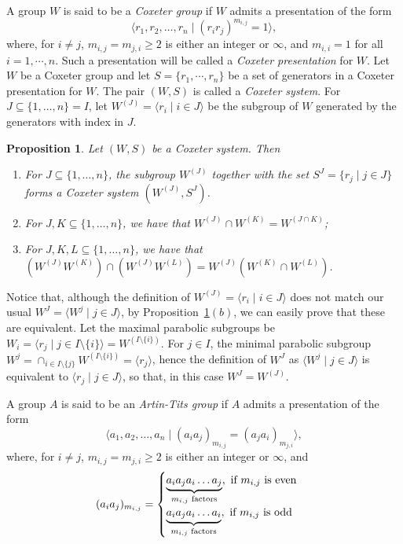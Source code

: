 \documentclass[11pt,letterpaper]{amsart}
\newtheorem{prop}{Proposition}[section]
\begin{document}
A group $W$ is said to be a \emph{Coxeter group} if $W$ admits a presentation of the form
$$\langle r_1,r_2,\ldots,r_n\mid (r_ir_j)^{m_{i,j}}=1 \rangle,$$
where, for $i\neq j$, $m_{i,j}=m_{j,i}\geq 2$ is either an integer or $\infty$, and $m_{i,i}=1$ for all $i =1,\cdots, n$. Such a presentation will be called a \textit{Coxeter presentation} for $W$.
Let $W$ be a Coxeter group and let $S= \{r_1,\cdots, r_n\}$ be a set of generators in a Coxeter presentation for $W$. The pair $(W,S)$ is called a \emph{Coxeter system}. For $J\subseteq \{1,\ldots,n\}=I$, let $W^{(J)}=\langle r_i\mid i\in J\rangle$ be the subgroup of $W$ generated by the generators with index in $J$.
\begin{prop}\cite[Chapter 4, Section §1,Theorem 2; Chapter 4, Exercise §1.1.b)]{Bourbaki2006}\label{prop:CoxeterProperties}
    Let $(W,S)$ be a Coxeter system.
    Then
    \begin{enumerate}
            \item For $J\subseteq \{1,\ldots,n\}$, the subgroup $W^{(J)}$ together with the set $S^J=\{r_j\mid j\in J \}$
            forms a Coxeter system $(W^{(J)},S^J)$. %
            \item For $J,K\subseteq \{1,\ldots,n\}$, we have that $W^{(J)} \cap W^{(K)} =W^{(J\cap K)}$;
            \item For $J,K,L\subseteq \{1,\ldots,n\}$, we have that $(W^{(J)}W^{(K)})\cap (W^{(J)}W^{(L)})=W^{(J)}(W^{(K)}\cap W^{(L)})$.
    \end{enumerate}
\end{prop}
Notice that, although the definition of $W^{(J)}=\langle r_i\mid i\in J\rangle$ does not match our usual $W^J=\langle W^j\mid j\in J\rangle$, by Proposition~\ref{prop:CoxeterProperties}$(b)$, we can easily prove that these are equivalent.
Let the maximal parabolic subgroups be $W_i = \langle r_j\mid j\in I\setminus\{i\}\rangle=W^{(I\setminus\{i\})}$. For $j\in I$, the minimal parabolic subgroup $W^j = \cap_{i\in I\setminus\{j\}} W^{(I\setminus\{i\})} = \langle r_j\rangle$, hence the definition of $W^J$ as $\langle W^j\mid j\in J\rangle$ is equivalent to $\langle r_j\mid j\in J\rangle$, so that, in this case $W^J=W^{(J)}$. 

A group $A$ is said to be an \emph{Artin-Tits group} if $A$ admits a presentation of the form
$$\langle a_1,a_2,\ldots,a_n\mid (a_ia_j)_{m_{i,j}}=(a_ja_i)_{m_{j,i}} \rangle,$$
where, for $i\neq j$, $m_{i,j}=m_{j,i}\geq 2$ is either an integer or $\infty$, and 
 \begin{equation*}
       (a_ia_j)_{m_{i,j}} =
        \begin{cases}
            \underbrace{a_ia_ja_i\ldots a_j }_{m_{i,j}\textnormal{ factors}}, \textnormal{ if } m_{i,j} \textnormal{ is even } \\
            \underbrace{a_ia_ja_i\ldots a_i }_{m_{i,j}\textnormal{ factors}}, \textnormal{ if } m_{i,j} \textnormal{ is odd }
        \end{cases}
    \end{equation*}
\end{document}
